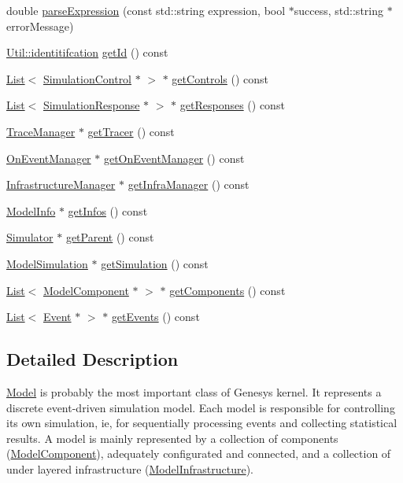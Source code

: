 \begin{DoxyCompactItemize}
double \hyperlink{class_model_a408ddfa761fcd04ec1211ae6c1526ab3}{parse\+Expression} (const std\+::string expression, bool $\ast$success, std\+::string $\ast$error\+Message)
\item 
\hyperlink{class_util_ad17d458d9344b10bba64347e514d6d71}{Util\+::identitifcation} \hyperlink{class_model_abfd7753d30de6abea64b3f0846e097eb}{get\+Id} () const 
\item 
\hyperlink{class_list}{List}$<$ \hyperlink{class_simulation_control}{Simulation\+Control} $\ast$ $>$ $\ast$ \hyperlink{class_model_a20c078a714fe7fba0f02ea1d50a19589}{get\+Controls} () const 
\item 
\hyperlink{class_list}{List}$<$ \hyperlink{class_simulation_response}{Simulation\+Response} $\ast$ $>$ $\ast$ \hyperlink{class_model_ad4caeecd30fd5eb67b46c232cfbea14b}{get\+Responses} () const 
\item 
\hyperlink{class_trace_manager}{Trace\+Manager} $\ast$ \hyperlink{class_model_adc0de22631d77864b7956591c39ebc60}{get\+Tracer} () const 
\item 
\hyperlink{class_on_event_manager}{On\+Event\+Manager} $\ast$ \hyperlink{class_model_afc9de1c6025e8332830b29958ede63a2}{get\+On\+Event\+Manager} () const 
\item 
\hyperlink{class_infrastructure_manager}{Infrastructure\+Manager} $\ast$ \hyperlink{class_model_a944c2b2dffd691d4aafc2d4028c02e6b}{get\+Infra\+Manager} () const 
\item 
\hyperlink{class_model_info}{Model\+Info} $\ast$ \hyperlink{class_model_ac0f1ea5fbbeba7a2992ee13516e7522f}{get\+Infos} () const 
\item 
\hyperlink{class_simulator}{Simulator} $\ast$ \hyperlink{class_model_a69ed4849ae7708a83ace16abb7251b20}{get\+Parent} () const 
\item 
\hyperlink{class_model_simulation}{Model\+Simulation} $\ast$ \hyperlink{class_model_a217487c8193eb6c0afd95a9315cd51bb}{get\+Simulation} () const 
\item 
\hyperlink{class_list}{List}$<$ \hyperlink{class_model_component}{Model\+Component} $\ast$ $>$ $\ast$ \hyperlink{class_model_ae5773d78fc47cb35be7fbeb74b7d63e4}{get\+Components} () const 
\item 
\hyperlink{class_list}{List}$<$ \hyperlink{class_event}{Event} $\ast$ $>$ $\ast$ \hyperlink{class_model_a841c78bda0eb27c652c6921094dc5921}{get\+Events} () const 
\end{DoxyCompactItemize}


\subsection{Detailed Description}
\hyperlink{class_model}{Model} is probably the most important class of Genesys kernel. It represents a discrete event-\/driven simulation model. Each model is responsible for controlling its own simulation, ie, for sequentially processing events and collecting statistical results. A model is mainly represented by a collection of components (\hyperlink{class_model_component}{Model\+Component}), adequately configurated and connected, and a collection of under layered infrastructure (\hyperlink{class_model_infrastructure}{Model\+Infrastructure}). 

